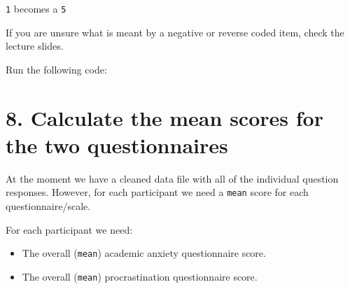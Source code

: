 \documentclass[
]{book}
\newenvironment{Shaded}{\begin{snugshade}}{\end{snugshade}}
\newcommand{\CommentTok}[1]{\textcolor[rgb]{0.56,0.35,0.01}{\textit{#1}}}
\newcommand{\DecValTok}[1]{\textcolor[rgb]{0.00,0.00,0.81}{#1}}
\newcommand{\NormalTok}[1]{#1}
\newcommand{\OtherTok}[1]{\textcolor[rgb]{0.56,0.35,0.01}{#1}}
\newcommand{\SpecialCharTok}[1]{\textcolor[rgb]{0.81,0.36,0.00}{\textbf{#1}}}
\let\oldsection\section
\renewcommand{\section}{\needspace{5\baselineskip}\oldsection}
\begin{document}
\texttt{1} becomes a \texttt{5}

If you are unsure what is meant by a negative or reverse coded item, check the lecture slides.

Run the following code:

\begin{Shaded}
\end{Shaded}

\section{\texorpdfstring{\textbf{8. Calculate the mean scores for the two questionnaires}}{8. Calculate the mean scores for the two questionnaires}}\label{calculate-the-mean-scores-for-the-two-questionnaires}

At the moment we have a cleaned data file with all of the individual question responses.
However, for each participant we need a \texttt{mean} score for each questionnaire/scale.

For each participant we need:

\begin{itemize}
\item
  The overall (\texttt{mean}) academic anxiety questionnaire score.
\item
  The overall (\texttt{mean}) procrastination questionnaire score.
\end{itemize}
\end{document}
